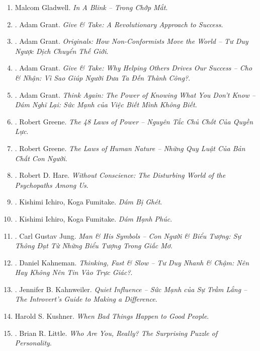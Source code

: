 \documentclass{article}
\begin{document}
\begin{enumerate}
	\item Malcom Gladwell. \textit{In A Blink -- Trong Chớp Mắt}.
	\item \cite{Grant2013}. Adam Grant. \textit{Give \& Take: A Revolutionary Approach to Success}.\hfill{\sf[reading]}
	\item \cite{Grant2020}. Adam Grant. \textit{Originals: How Non-Conformists Move the World -- Tư Duy Ngược Dịch Chuyển Thế Giới}.\hfill{\sf[finished]}
	\item \cite{Grant2022a}. Adam Grant. \textit{Give \& Take: Why Helping Others Drives Our Success -- Cho \& Nhận: Vì Sao Giúp Người Đưa Ta Đến Thành Công?}.\hfill{\sf[finished]}
	\item \cite{Grant2022b}. Adam Grant. \textit{Think Again: The Power of Knowing What You Don't Know -- Dám Nghĩ Lại: Sức Mạnh của Việc Biết Mình Không Biết}.\hfill{\sf[finished]}
	\item \cite{Greene_laws_power}. Robert Greene. \textit{The 48 Laws of Power -- Nguyên Tắc Chủ Chốt Của Quyền Lực}.\hfill{\sf[finished]}
	\item \cite{Greene_laws_human_nature}. Robert Greene. \textit{The Laws of Human Nature -- Những Quy Luật Của Bản Chất Con Người}.\hfill{\sf[finished]}
	\item \cite{Hare1999}. Robert D. Hare. \textit{Without Conscience: The Disturbing World of the Psychopaths Among Us}.\hfill{\sf[reading]}
	\item \cite{Ichiro_Fumitake2022a}. Kishimi Ichiro, Koga Fumitake. \textit{Dám Bị Ghét}.\hfill{\sf[finished]}
	\item \cite{Ichiro_Fumitake2022b}. Kishimi Ichiro, Koga Fumitake. \textit{Dám Hạnh Phúc}.\hfill{\sf[finished]}
	\item \cite{Jung2022}. Carl Gustav Jung. \textit{Man \& His Symbols -- Con Người \& Biểu Tượng: Sự Thông Đạt Từ Những Biểu Tượng Trong Giấc Mơ}.\hfill{\sf[finished]}
	\item \cite{Kahneman2022}. Daniel Kahneman. \textit{Thinking, Fast \& Slow -- Tư Duy Nhanh \& Chậm: Nên Hay Không Nên Tin Vào Trực Giác?}.\\\mbox{}\hfill{\sf[finished]}
	\item \cite{Kahnweiler2022}. Jennifer B. Kahnweiler. \textit{Quiet Influence -- Sức Mạnh của Sự Trầm Lắng -- The Introvert's Guide to Making a Difference}.\hfill{\sf[finished]}
	\item Harold S. Kushner. \textit{When Bad Things Happen to Good People}.
	\item \cite{Little2017}. Brian R. Little. \textit{Who Are You, Really? The Surprising Puzzle of Personality}.\hfill{\sf[finished]}

\end{enumerate}
\end{document}
